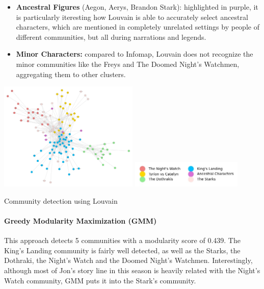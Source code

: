 \documentclass[10pt,twocolumn,letterpaper]{article}
\begin{document}
\begin{itemize}
    \item \textbf{Ancestral Figures} (Aegon, Aerys, Brandon Stark): highlighted in purple, it is particularly iteresting how Louvain is able to accurately select ancestral characters, which are mentioned in completely unrelated settings by people of different communities, but all during narrations and legends.
    \item \textbf{Minor Characters:} compared to Infomap, Louvain does not recognize the minor communities like the Freys and The Doomed Night's Watchmen, aggregating them to other clusters.
\end{itemize}

\begin{center}
    \includegraphics[width=0.5\textwidth]{img/s1/communities_louvain.jpg}
    \includegraphics[width=0.4\textwidth]{img/s1/louvain_legend.jpg}
    \caption{\small{Community detection using Louvain}}
\end{center}

\paragraph{Greedy Modularity Maximization (GMM)}

This approach detects 5 communities with a modularity score of 0.439.
The King's Landing community is fairly well detected, as well as the Starks, the Dothraki, the Night's Watch and the Doomed Night's Watchmen. Interestingly, although most of Jon's story line in this season is heavily related with the Night's Watch community, GMM puts it into the Stark's community. 
\end{document}
